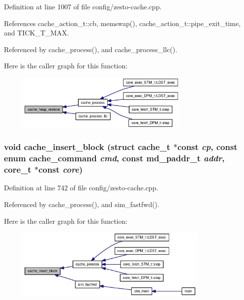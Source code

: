Definition at line 1007 of file config/zesto-cache.cpp.

References cache\_\-action\_\-t::cb, memswap(), cache\_\-action\_\-t::pipe\_\-exit\_\-time, and TICK\_\-T\_\-MAX.

Referenced by cache\_\-process(), and cache\_\-process\_\-llc().

Here is the caller graph for this function:\nopagebreak
\begin{figure}[H]
\begin{center}
\leavevmode
\includegraphics[width=237pt]{config_2zesto-cache_8cpp_672e06f81a893ac6af2c4fd4948069ed_icgraph}
\end{center}
\end{figure}
\subsubsection[{cache\_\-insert\_\-block}]{\setlength{\rightskip}{0pt plus 5cm}void cache\_\-insert\_\-block (struct {\bf cache\_\-t} $\ast$const  {\em cp}, \/  const enum {\bf cache\_\-command} {\em cmd}, \/  const {\bf md\_\-paddr\_\-t} {\em addr}, \/  {\bf core\_\-t} $\ast$const  {\em core})}\label{config_2zesto-cache_8cpp_1f7522c0547a72f15e199abba2f63812}




Definition at line 742 of file config/zesto-cache.cpp.

Referenced by cache\_\-process(), and sim\_\-fastfwd().

Here is the caller graph for this function:\nopagebreak
\begin{figure}[H]
\begin{center}
\leavevmode
\includegraphics[width=263pt]{config_2zesto-cache_8cpp_1f7522c0547a72f15e199abba2f63812_icgraph}
\end{center}
\end{figure}
